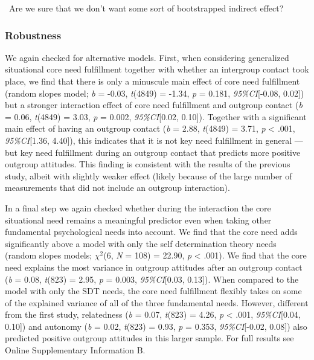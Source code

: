 \documentclass[man, 12pt, a4paper]{apa7}
\theoremstyle{break}
\theoremstyle{plain}
\begin{document}
\faQuestionCircle~Are we sure that we don't want some sort of
bootstrapped indirect effect?

\subsubsection{Robustness}

We again checked for alternative models. First, when considering
generalized situational core need fulfillment together with whether an
intergroup contact took place, we find that there is only a minuscule
main effect of core need fulfillment (random slopes model; \textit{b} =
-0.03, \textit{t}(4849) = -1.34, \textit{p} = 0.181,
\textit{95\%CI}{[}-0.08, 0.02{]}) but a stronger interaction effect of
core need fulfillment and outgroup contact (\textit{b} = 0.06,
\textit{t}(4849) = 3.03, \textit{p} = 0.002, \textit{95\%CI}{[}0.02,
0.10{]}). Together with a significant main effect of having an outgroup
contact (\textit{b} = 2.88, \textit{t}(4849) = 3.71, \textit{p}
\textless{} .001, \textit{95\%CI}{[}1.36, 4.40{]}), this indicates that
it is not key need fulfillment in general --- but key need fulfillment
during an outgroup contact that predicts more positive outgroup
attitudes. This finding is consistent with the results of the previous
study, albeit with slightly weaker effect (likely because of the large
number of measurements that did not include an outgroup interaction).

In a final step we again checked whether during the interaction the core
situational need remains a meaningful predictor even when taking other
fundamental psychological needs into account. We find that the core need
adds significantly above a model with only the self determination theory
needs (random slopes models; \(\chi^2\)(6, \textit{N} = 108) = 22.90,
\textit{p} \textless{} .001). We find that the core need explains the
most variance in outgroup attitudes after an outgroup contact
(\textit{b} = 0.08, \textit{t}(823) = 2.95, \textit{p} = 0.003,
\textit{95\%CI}{[}0.03, 0.13{]}). When compared to the model with only
the SDT needs, the core need fulfillment flexibly takes on some of the
explained variance of all of the three fundamental needs. However,
different from the first study, relatedness (\textit{b} = 0.07,
\textit{t}(823) = 4.26, \textit{p} \textless{} .001,
\textit{95\%CI}{[}0.04, 0.10{]}) and autonomy (\textit{b} = 0.02,
\textit{t}(823) = 0.93, \textit{p} = 0.353, \textit{95\%CI}{[}-0.02,
0.08{]}) also predicted positive outgroup attitudes in this larger
sample. For full results see Online Supplementary Information B.
\end{document}
